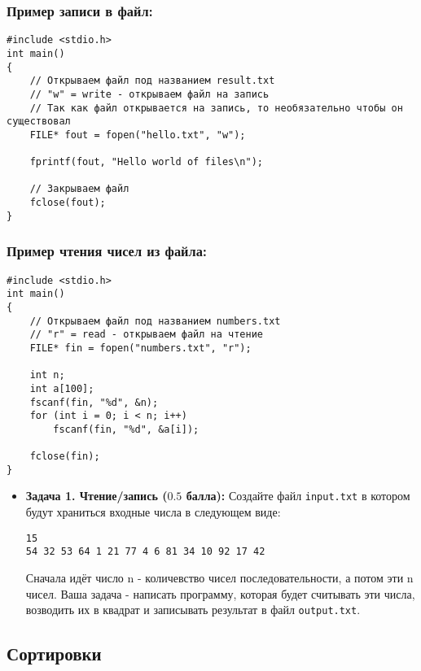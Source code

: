 \documentclass{article}
\begin{document}
\subsubsection*{Пример записи в файл:}
\begin{lstlisting}
#include <stdio.h>
int main()
{
	// Открываем файл под названием result.txt
	// "w" = write - открываем файл на запись
	// Так как файл открывается на запись, то необязательно чтобы он существовал
	FILE* fout = fopen("hello.txt", "w");
	
	fprintf(fout, "Hello world of files\n");	
		
	// Закрываем файл
	fclose(fout);
}
\end{lstlisting}
\subsubsection*{Пример чтения чисел из файла:}
\begin{lstlisting}
#include <stdio.h>
int main()
{
	// Открываем файл под названием numbers.txt
	// "r" = read - открываем файл на чтение
	FILE* fin = fopen("numbers.txt", "r");
	
	int n;
	int a[100];
	fscanf(fin, "%d", &n);
	for (int i = 0; i < n; i++)
		fscanf(fin, "%d", &a[i]);	
		
	fclose(fin);
}
\end{lstlisting}

\begin{itemize}
\item \textbf{Задача 1. Чтение/запись ($0.5$ балла):} Создайте файл \texttt{input.txt} в котором будут храниться входные числа в следующем виде:
\begin{lstlisting}
15
54 32 53 64 1 21 77 4 6 81 34 10 92 17 42
\end{lstlisting}
Сначала идёт число n - количевство чисел последовательности, а потом эти n чисел. Ваша задача - написать программу, которая будет считывать эти числа, возводить их в квадрат и записывать результат в файл \texttt{output.txt}.
\end{itemize}
\newpage

\subsection{Сортировки}
\end{document}
